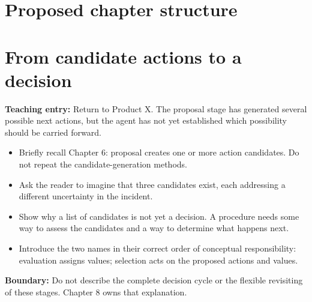 \section*{Proposed chapter structure}

\section{From candidate actions to a decision}
\textbf{Teaching entry:} Return to Product X. The proposal stage has generated several possible next actions, but the agent has not yet established which possibility should be carried forward.
\begin{itemize}
  \item Briefly recall Chapter 6: proposal creates one or more action candidates. Do not repeat the candidate-generation methods.
  \item Ask the reader to imagine that three candidates exist, each addressing a different uncertainty in the incident.
  \item Show why a list of candidates is not yet a decision. A procedure needs some way to assess the candidates and a way to determine what happens next.
  \item Introduce the two names in their correct order of conceptual responsibility: evaluation assigns values; selection acts on the proposed actions and values.
\end{itemize}
\textbf{Boundary:} Do not describe the complete decision cycle or the flexible revisiting of these stages. Chapter 8 owns that explanation. 


